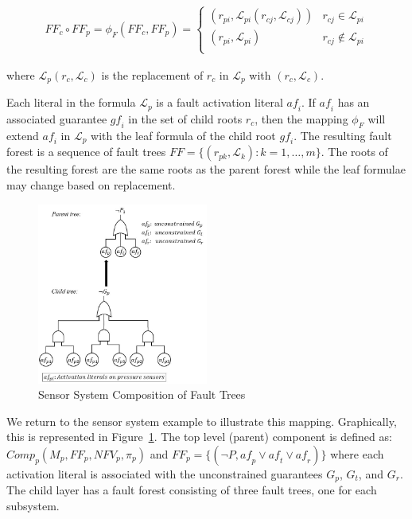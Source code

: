 \begin{gather}
\mathit{FF}_c \circ \mathit{FF}_p = \phi_F(\mathit{FF}_c, \mathit{FF}_p) =\begin{cases} 
      (r_{pi}, \mathcal{L}_{pi}(r_{cj}, \mathcal{L}_{cj})) & r_{cj} \in \mathcal{L}_{pi} \\
      (r_{pi}, \mathcal{L}_{pi}) & r_{cj} \not\in \mathcal{L}_{pi} \\
   \end{cases}
\end{gather}

where $\mathcal{L}_p(r_c, \mathcal{L}_c)$ is the replacement of $r_c$ in $\mathcal{L}_p$ with $(r_c, \mathcal{L}_c)$.

Each literal in the formula $\mathcal{L}_p$ is a fault activation literal $\mathit{af_i}$. If $\mathit{af_i}$ has an associated guarantee $\mathit{gf_i}$ in the set of child roots $r_c$, then the mapping $\phi_F$ will extend $\mathit{af_i}$ in $\mathcal{L}_p$ with the leaf formula of the child root $\mathit{gf_i}$.  The resulting fault forest is a sequence of fault trees $\mathit{FF} = \{(r_{pk}, \mathcal{L}_{k}): k = 1,\dots,m\}$. The roots of the resulting forest are the same roots as  the parent forest while the leaf formulae may change based on replacement. 



\begin{figure}[h!]
	\begin{center}
		\includegraphics[width=0.5\textwidth]{images/faultCompEx.JPG}
	\end{center}
	\caption{Sensor System Composition of Fault Trees}
	\label{fig:sensorSysComp}
\end{figure}
We return to the sensor system example to illustrate this mapping. Graphically, this is represented in Figure~\ref{fig:sensorSysComp}.  The top level (parent) component is defined as: $\mathit{Comp}_p (M_p, \mathit{FF}_p, \mathit{NFV}_p, \pi_p)$ and $\mathit{FF}_p = \{(\neg P, \mathit{af}_p \lor \mathit{af}_t \lor \mathit{af}_r)\}$ where each activation literal is associated with the unconstrained guarantees $G_p$, $G_t$, and $G_r$. The child layer has a fault forest consisting of three fault trees, one for each subsystem. 

